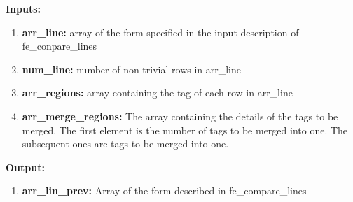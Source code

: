 \documentclass[a4paper, oneside,11pt]{article}
\begin{document}
\textbf{Inputs:}
\begin{enumerate}
    \item \textbf{arr\_line:} array of the form specified in the input description of fe\_conpare\_lines
    \item \textbf{num\_line:} number of non-trivial rows in arr\_line
    \item \textbf{arr\_regions:} array containing the tag of each row in arr\_line
    \item \textbf{arr\_merge\_regions:} The array containing the details of the tags to be merged. The first element is the number of tags to be merged into one. The subsequent ones are tags to be merged into one.
\end{enumerate}

\textbf{Output:}
\begin{enumerate}
    \item \textbf{arr\_lin\_prev:} Array of the form described in fe\_compare\_lines
\end{enumerate}

    
    
\end{document}
